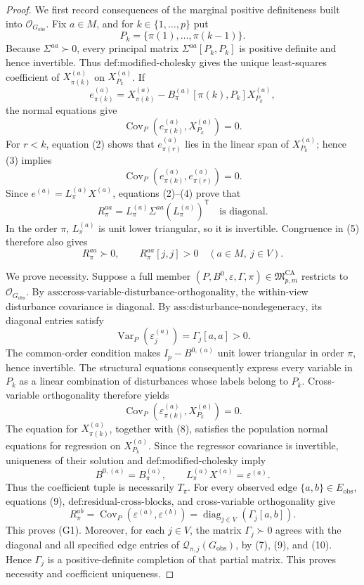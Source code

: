 \documentclass{article}
\begin{document}
\begin{proof}
We first record consequences of the marginal positive definiteness built into \(\mathcal O_{G_{\mathrm{obs}}}\).  Fix \(a\in M\), and for \(k\in\{1,\ldots,p\}\) put
\[
P_k=\{\pi(1),\ldots,\pi(k-1)\}.
\tag{1}
\]
Because \(\Sigma^{aa}\succ0\), every principal matrix \(\Sigma^{aa}[P_k,P_k]\) is positive definite and hence invertible.  Thus \(\text{def:modified-cholesky}\) gives the unique least-squares coefficient of \(X_{\pi(k)}^{(a)}\) on \(X_{P_k}^{(a)}\).  If
\[
e_{\pi(k)}^{(a)}
=X_{\pi(k)}^{(a)}
-B_\pi^{(a)}[\pi(k),P_k]X_{P_k}^{(a)},
\tag{2}
\]
the normal equations give
\[
\operatorname{Cov}_P\!\left(e_{\pi(k)}^{(a)},X_{P_k}^{(a)}\right)=0.
\tag{3}
\]
For \(r<k\), equation (2) shows that \(e_{\pi(r)}^{(a)}\) lies in the linear span of \(X_{P_k}^{(a)}\); hence (3) implies
\[
\operatorname{Cov}_P\!\left(e_{\pi(k)}^{(a)},e_{\pi(r)}^{(a)}\right)=0.
\tag{4}
\]
Since \(e^{(a)}=L_\pi^{(a)}X^{(a)}\), equations (2)--(4) prove that
\[
R_\pi^{aa}
=L_\pi^{(a)}\Sigma^{aa}(L_\pi^{(a)})^{\mathsf T}
\quad\text{is diagonal}.
\tag{5}
\]
In the order \(\pi\), \(L_\pi^{(a)}\) is unit lower triangular, so it is invertible.  Congruence in (5) therefore also gives
\[
R_\pi^{aa}\succ0,
\qquad R_\pi^{aa}[j,j]>0
\quad(a\in M,\ j\in V).
\tag{6}
\]

We prove necessity.  Suppose a full member \((P,B^0,\varepsilon,\Gamma,\pi)\in\mathfrak M_{p,m}^{\mathrm{CA}}\) restricts to \(\mathcal O_{G_{\mathrm{obs}}}\).  By \(\text{ass:cross-variable-disturbance-orthogonality}\), the within-view disturbance covariance is diagonal.  By \(\text{ass:disturbance-nondegeneracy}\), its diagonal entries satisfy
\[
\operatorname{Var}_P(\varepsilon_j^{(a)})
=\Gamma_j[a,a]>0.
\tag{7}
\]
The common-order condition makes \(I_p-B^{0,(a)}\) unit lower triangular in order \(\pi\), hence invertible.  The structural equations consequently express every variable in \(P_k\) as a linear combination of disturbances whose labels belong to \(P_k\).  Cross-variable orthogonality therefore yields
\[
\operatorname{Cov}_P\!\left(\varepsilon_{\pi(k)}^{(a)},X_{P_k}^{(a)}\right)=0.
\tag{8}
\]
The equation for \(X_{\pi(k)}^{(a)}\), together with (8), satisfies the population normal equations for regression on \(X_{P_k}^{(a)}\).  Since the regressor covariance is invertible, uniqueness of their solution and \(\text{def:modified-cholesky}\) imply
\[
B^{0,(a)}=B_\pi^{(a)},
\qquad
L_\pi^{(a)}X^{(a)}=\varepsilon^{(a)}.
\tag{9}
\]
Thus the coefficient tuple is necessarily \(T_\pi\).  For every observed edge \(\{a,b\}\in E_{\mathrm{obs}}\), equations (9), \(\text{def:residual-cross-blocks}\), and cross-variable orthogonality give
\[
R_\pi^{ab}
=\operatorname{Cov}_P(\varepsilon^{(a)},\varepsilon^{(b)})
=\operatorname{diag}_{j\in V}(\Gamma_j[a,b]).
\tag{10}
\]
This proves (G1).  Moreover, for each \(j\in V\), the matrix \(\Gamma_j\succ0\) agrees with the diagonal and all specified edge entries of \(\mathcal Q_{\pi,j}(G_{\mathrm{obs}})\), by (7), (9), and (10).  Hence \(\Gamma_j\) is a positive-definite completion of that partial matrix.  This proves necessity and coefficient uniqueness.


\end{proof}
\end{document}
